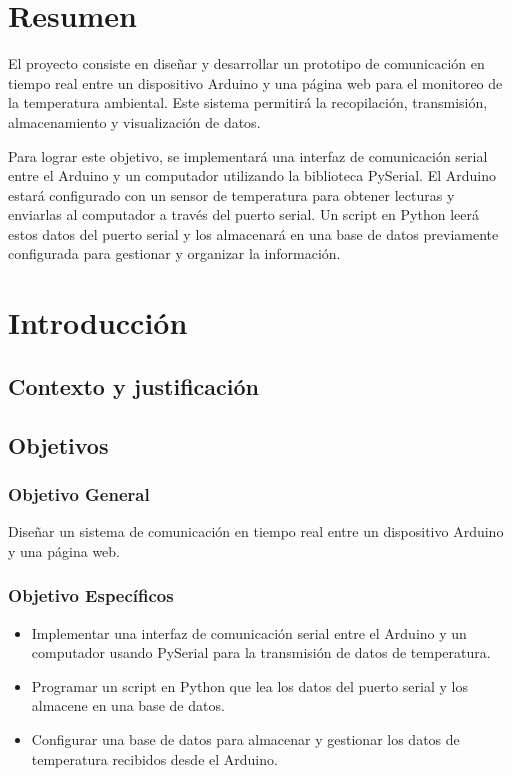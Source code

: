\documentclass[11pt,a4paper,openany]{report}
\author{Andrade oscco jose}
\begin{document}
	
\chapter{Resumen}
	El proyecto consiste en diseñar y desarrollar un prototipo de comunicación en tiempo real entre un dispositivo Arduino y una página web para el monitoreo de la temperatura ambiental. Este sistema permitirá la recopilación, transmisión, almacenamiento y visualización de datos.
	
	Para lograr este objetivo, se implementará una interfaz de comunicación serial entre el Arduino y un computador utilizando la biblioteca PySerial. El Arduino estará configurado con un sensor de temperatura para obtener lecturas y enviarlas al computador a través del puerto serial. Un script en Python leerá estos datos del puerto serial y los almacenará en una base de datos previamente configurada para gestionar y organizar la información.	
\chapter{Introducción}
\section{Contexto y justificación}	
\section{Objetivos}
\subsection{Objetivo General}
	Diseñar un  sistema de comunicación en tiempo real entre un dispositivo Arduino y una página web.
\subsection{Objetivo Específicos}
\begin{itemize}
		\item Implementar una interfaz de comunicación serial entre el Arduino y un computador usando PySerial para la transmisión de datos de temperatura.
		\item Programar un script en Python que lea los datos del puerto serial y los almacene en una base de datos.
		\item Configurar una base de datos para almacenar y gestionar los datos de temperatura recibidos desde el Arduino.
\end{itemize}
\end{document}
